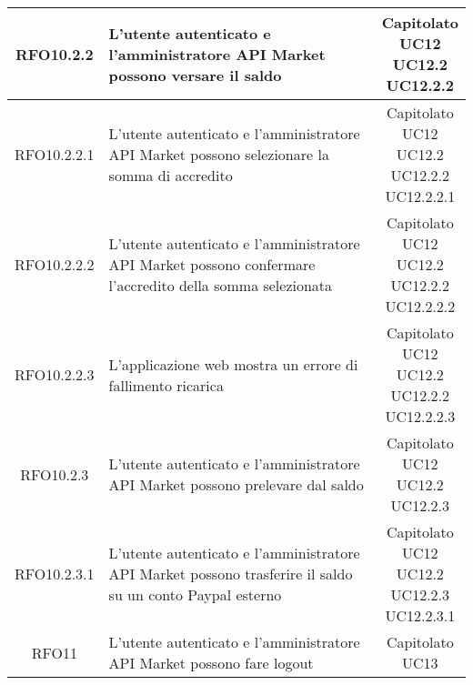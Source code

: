 \begin{longtable}{|c|p{8cm}|c|}
RFO10.2.2 &  L'utente autenticato e l'amministratore API Market possono versare il saldo & \makecell*{Capitolato\\UC12\\UC12.2\\UC12.2.2} \\
\hline

RFO10.2.2.1 &  L'utente autenticato e l'amministratore API Market possono selezionare la somma di accredito & \makecell*{Capitolato\\UC12\\UC12.2\\UC12.2.2\\UC12.2.2.1} \\
\hline

RFO10.2.2.2 &  L'utente autenticato e l'amministratore API Market possono confermare l'accredito della somma selezionata & \makecell*{Capitolato\\UC12\\UC12.2\\UC12.2.2\\UC12.2.2.2} \\
\hline

RFO10.2.2.3 &  L'applicazione web mostra un errore di fallimento ricarica & \makecell*{Capitolato\\UC12\\UC12.2\\UC12.2.2\\UC12.2.2.3} \\
\hline

RFO10.2.3 &  L'utente autenticato e l'amministratore API Market possono prelevare dal saldo & \makecell*{Capitolato\\UC12\\UC12.2\\UC12.2.3} \\
\hline

RFO10.2.3.1 &  L'utente autenticato e l'amministratore API Market possono trasferire il saldo su un conto Paypal esterno & \makecell*{Capitolato\\UC12\\UC12.2\\UC12.2.3\\UC12.2.3.1} \\
\hline

RFO11 &  L'utente autenticato e l'amministratore API Market possono fare logout & \makecell*{Capitolato\\UC13} \\
\hline


\end{longtable}
